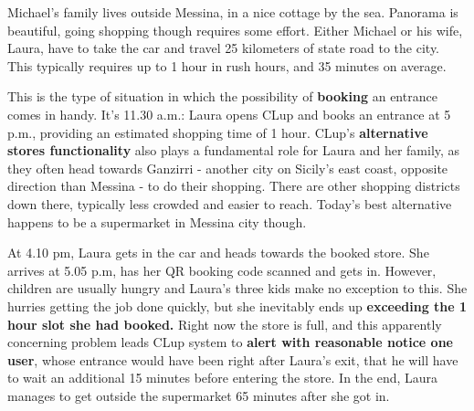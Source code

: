 Michael's family lives outside Messina, in a nice cottage by the sea. Panorama is beautiful, going shopping though requires some effort. \newline
Either Michael or his wife, Laura, have to take the car and travel 25 kilometers of state road to the city. This typically requires up to 1 hour in rush hours, and 35 minutes on average.

This is the type of situation in which the possibility of \textbf{booking} an entrance comes in handy. It's 11.30 a.m.: Laura opens CLup and books an entrance at 5 p.m., providing an estimated shopping time of 1 hour. \newline
CLup's \textbf{alternative stores functionality} also plays a fundamental role for Laura and her family, as they often head towards Ganzirri - another city on Sicily's east coast, opposite direction than Messina - to do their shopping. There are other shopping districts down there, typically less crowded and easier to reach. Today's best alternative happens to be a supermarket in Messina city though.

At 4.10 pm, Laura gets in the car and heads towards the booked store. She arrives at 5.05 p.m, has her QR booking code scanned and gets in. \newline
However, children are usually hungry and Laura's three kids make no exception to this. She hurries getting the job done quickly, but she inevitably ends up \textbf{exceeding the 1 hour slot she had booked.} \newline
Right now the store is full, and this apparently concerning problem leads CLup system to \textbf{alert with reasonable notice one user}, whose entrance would have been right after Laura's exit, that he will have to wait an additional 15 minutes before entering the store. \newline
In the end, Laura manages to get outside the supermarket 65 minutes after she got in. 


